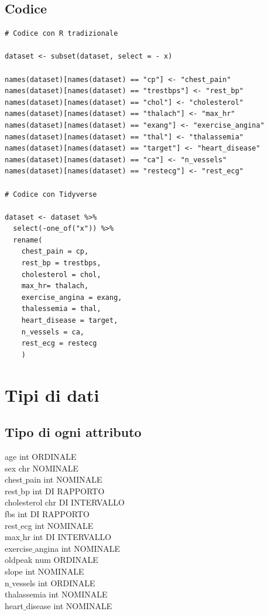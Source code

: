 \documentclass{article}
\begin{document}
\subsection { Codice }
\begin{lstlisting}
# Codice con R tradizionale 

dataset <- subset(dataset, select = - x)

names(dataset)[names(dataset) == "cp"] <- "chest_pain"
names(dataset)[names(dataset) == "trestbps"] <- "rest_bp"
names(dataset)[names(dataset) == "chol"] <- "cholesterol"
names(dataset)[names(dataset) == "thalach"] <- "max_hr"
names(dataset)[names(dataset) == "exang"] <- "exercise_angina"
names(dataset)[names(dataset) == "thal"] <- "thalassemia"
names(dataset)[names(dataset) == "target"] <- "heart_disease"
names(dataset)[names(dataset) == "ca"] <- "n_vessels"
names(dataset)[names(dataset) == "restecg"] <- "rest_ecg"

# Codice con Tidyverse

dataset <- dataset %>%  
  select(-one_of("x")) %>%
  rename(
    chest_pain = cp,
    rest_bp = trestbps,
    cholesterol = chol,
    max_hr= thalach,
    exercise_angina = exang,
    thalessemia = thal,
    heart_disease = target,
    n_vessels = ca,
    rest_ecg = restecg
    )

 \end{lstlisting}

\section { Tipi di dati }
\subsection { Tipo di ogni attributo }

age               int    ORDINALE\\
sex               chr    NOMINALE\\
chest$\_$pain        int    NOMINALE\\
rest$\_$bp           int    DI RAPPORTO\\
cholesterol       chr    DI INTERVALLO\\
fbs               int    DI RAPPORTO\\
rest$\_$ecg          int    NOMINALE\\
max$\_$hr            int    DI INTERVALLO\\
exercise$\_$angina   int    NOMINALE\\
oldpeak           num    ORDINALE\\
slope             int    NOMINALE\\
n$\_$vessels         int    ORDINALE\\
thalassemia       int    NOMINALE\\
heart$\_$disease     int    NOMINALE
\end{document}
